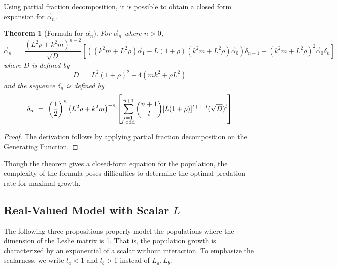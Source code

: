 \documentclass[11pt,reqno]{amsart}
\numberwithin{equation}{section}
\theoremstyle{plain}
\newtheorem{theorem}[thm]{Theorem}
\begin{document}
Using partial fraction decomposition, it is possible to obtain 
a closed form expansion for $\vec \alpha_n$. 

\begin{theorem} [Formula for $\vec \alpha_n$]
    For $\vec \alpha_n$ where $n > 0$, 
    \begin{equation}
    \vec \alpha_n \ = \ 
    \frac {
(L^2 \rho + k^2 m)^{n - 2}
    } {\sqrt D} 
    \left[
        \left(
            (k^2m + L^2 \rho) \vec \alpha_1 - L(1 + \rho) 
\left(
            k^2m + L^2\rho
        \right)
            \vec \alpha_0
        \right)\delta_{n - 1}
        + \left(
            k^2m + L^2\rho
        \right)^2\vec \alpha_0 \delta_{n}
    \right]
    \end{equation}
    where $D$ is defined by
    \begin{equation}
        D \ = \ L ^2 (1 + \rho)^2 - 4 (mk^2 + \rho L^2)
    \end{equation}
    and the sequence $\delta_n$ is defined by 
    \begin{equation}
        \delta_n \ = \ 
        \left(
            \frac 1 2
        \right)^n 
        \left(
                L^2 \rho + k^2 m
        \right)^{-n}
        \left[
            \sum_{\substack{l = 1 \\ l \textnormal{ odd}}}^{n + 1}
            \binom{n + 1}{l} 
            [L(1+\rho)]^{t + 1 - l}(\sqrt D)^l
        \right]
    \end{equation}
\end{theorem}

\begin{proof}
    The derivation follows by applying partial fraction decomposition on the 
    Generating Function. 
\end{proof}

Though the theorem gives a closed-form equation for the population, 
the complexity of the formula poses difficulties to determine the optimal 
predation rate for maximal growth.

\subsection{Real-Valued Model with Scalar $L$}\label{sec:scalarModel}


The following three propositions properly model 
the populations where the dimension of the Leslie matrix 
is 1. That is, the population growth is characterized 
by an exponential of a scalar without interaction. 
To emphasize the scalarness, we write $l_a < 1$ and $l_b > 1$ 
instead of $L_a, L_b$. 
\end{document}
